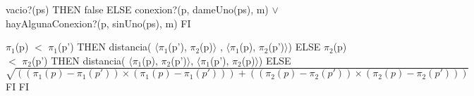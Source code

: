 \begin{tad}{}
		{\IF vacio?(ps) THEN
			false
		ELSE
			conexion?(p, dameUno(ps), m) $\lor$ hayAlgunaConexion?(p, sinUno(ps), m)
		FI}


		{\IF $\pi_1$(p) $<$ $\pi_1$(p')  THEN
			distancia( $\langle\pi_1$(p'), $\pi_2$(p)$\rangle$ , $\langle\pi_1$(p), $\pi_2$(p')$\rangle$)
		ELSE
			{\IF $\pi_2$(p) $<$ $\pi_2$(p') THEN
				distancia( $\langle\pi_1$(p), $\pi_2$(p')$\rangle$, $\langle\pi_1$(p'), $\pi_2$(p)$\rangle$)
			ELSE
				$\sqrt{((\pi_1(p) - \pi_1(p')) \times (\pi_1(p) - \pi_1(p'))) + ((\pi_2(p) - \pi_2(p')) \times (\pi_2(p) - \pi_2(p')))}$
			FI}
		FI}

\end{tad}